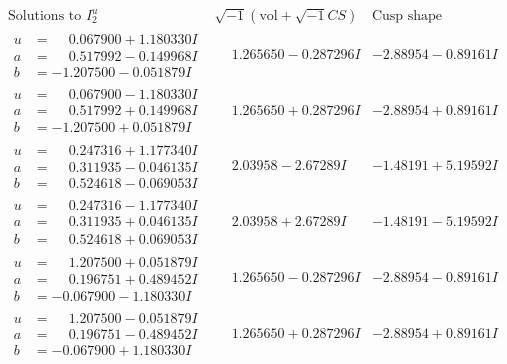 \documentclass[1p]{elsarticle_modified}
\theoremstyle{definition}
\newcommand{\I}{\sqrt{-1}}
\begin{document}
$$\begin{array}{c|c|c}  
\text{Solutions to }I^u_{2}& \I (\text{vol} + \sqrt{-1}CS) & \text{Cusp shape}\\
 \hline 
\begin{aligned}
u &= \phantom{-}0.067900 + 1.180330 I \\
a &= \phantom{-}0.517992 - 0.149968 I \\
b &= -1.207500 - 0.051879 I\end{aligned}
 & \phantom{-}1.265650 - 0.287296 I & -2.88954 - 0.89161 I \\ \hline\begin{aligned}
u &= \phantom{-}0.067900 - 1.180330 I \\
a &= \phantom{-}0.517992 + 0.149968 I \\
b &= -1.207500 + 0.051879 I\end{aligned}
 & \phantom{-}1.265650 + 0.287296 I & -2.88954 + 0.89161 I \\ \hline\begin{aligned}
u &= \phantom{-}0.247316 + 1.177340 I \\
a &= \phantom{-}0.311935 - 0.046135 I \\
b &= \phantom{-}0.524618 - 0.069053 I\end{aligned}
 & \phantom{-}2.03958 - 2.67289 I & -1.48191 + 5.19592 I \\ \hline\begin{aligned}
u &= \phantom{-}0.247316 - 1.177340 I \\
a &= \phantom{-}0.311935 + 0.046135 I \\
b &= \phantom{-}0.524618 + 0.069053 I\end{aligned}
 & \phantom{-}2.03958 + 2.67289 I & -1.48191 - 5.19592 I \\ \hline\begin{aligned}
u &= \phantom{-}1.207500 + 0.051879 I \\
a &= \phantom{-}0.196751 + 0.489452 I \\
b &= -0.067900 - 1.180330 I\end{aligned}
 & \phantom{-}1.265650 - 0.287296 I & -2.88954 - 0.89161 I \\ \hline\begin{aligned}
u &= \phantom{-}1.207500 - 0.051879 I \\
a &= \phantom{-}0.196751 - 0.489452 I \\
b &= -0.067900 + 1.180330 I\end{aligned}
 & \phantom{-}1.265650 + 0.287296 I & -2.88954 + 0.89161 I \\ \hline\begin{aligned}

\end{aligned}
\end{array}$$
\end{document}
